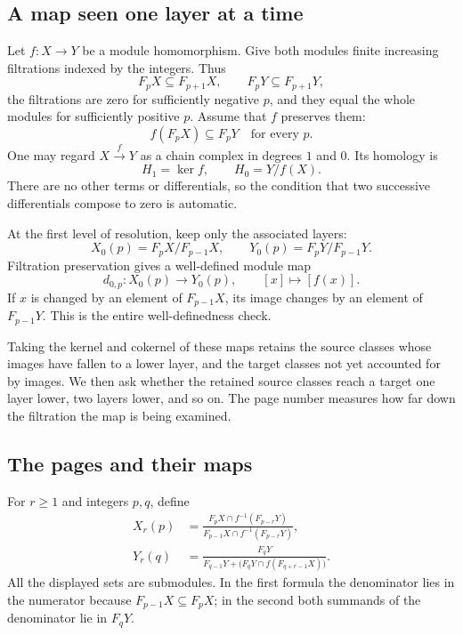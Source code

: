 \documentclass[11pt]{article}
\theoremstyle{definition}
\theoremstyle{remark}\newtheorem{remark}[theorem]{Remark}
\DeclareMathOperator{\Ker}{ker}
\begin{document}
\subsection{A map seen one layer at a time}

Let $f:X\to Y$ be a module homomorphism. Give both modules finite
increasing filtrations indexed by the integers. Thus
\[
F_pX\subseteq F_{p+1}X,\qquad F_pY\subseteq F_{p+1}Y,
\]
the filtrations are zero for sufficiently negative $p$, and they equal
the whole modules for sufficiently positive $p$. Assume that $f$ preserves
them:
\[
f(F_pX)\subseteq F_pY\quad\text{for every }p.
\]
One may regard $X\xrightarrow{f}Y$ as a chain complex in degrees $1$ and
$0$. Its homology is
\[
H_1=\Ker f,\qquad H_0=Y/f(X).
\]
There are no other terms or differentials, so the condition that two
successive differentials compose to zero is automatic.

At the first level of resolution, keep only the associated layers:
\[
X_0(p)=F_pX/F_{p-1}X,\qquad
Y_0(p)=F_pY/F_{p-1}Y.
\]
Filtration preservation gives a well-defined module map
\[
d_{0,p}:X_0(p)\longrightarrow Y_0(p),\qquad [x]\longmapsto[f(x)].
\]
If $x$ is changed by an element of $F_{p-1}X$, its image changes by an
element of $F_{p-1}Y$. This is the entire well-definedness check.

Taking the kernel and cokernel of these maps retains the source classes
whose images have fallen to a lower layer, and the target classes not yet
accounted for by images. We then ask whether the retained source classes
reach a target one layer lower, two layers lower, and so on. The page
number measures how far down the filtration the map is being examined.

\subsection{The pages and their maps}

For $r\geq1$ and integers $p,q$, define
\begin{align}
X_r(p)
&=
\frac{F_pX\cap f^{-1}(F_{p-r}Y)}
     {F_{p-1}X\cap f^{-1}(F_{p-r}Y)},
\label{s:source-page}\\[3pt]
Y_r(q)
&=
\frac{F_qY}
     {F_{q-1}Y+\bigl(F_qY\cap f(F_{q+r-1}X)\bigr)}.
\label{s:target-page}
\end{align}
All the displayed sets are submodules. In the first formula the
denominator lies in the numerator because $F_{p-1}X\subseteq F_pX$;
in the second both summands of the denominator lie in $F_qY$.
\end{document}
